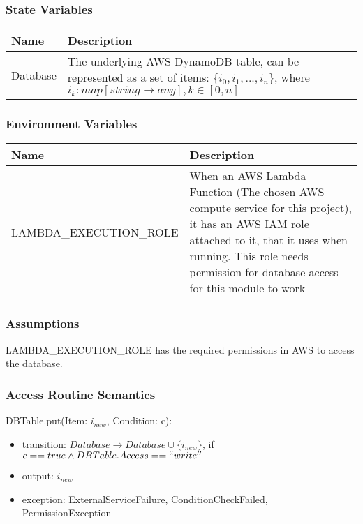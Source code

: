 \documentclass[12pt, titlepage]{article}
\begin{document}
\subsubsection{State Variables}

\begin{center}
  \begin{tabular}{p{4cm} p{12cm}}
    \hline
    \textbf{Name} & \textbf{Description} \\
    \hline
    Database & The underlying AWS DynamoDB table, can be represented
    as a set of items: $\{i_0, i_1, ..., i_n\}$, where $i_k:
    map[string \rightarrow  any], k\in[0,n]$ \\
    \hline
  \end{tabular}
\end{center}

\subsubsection{Environment Variables}

\begin{center}
  \begin{tabular}{p{6cm} p{10cm}}
    \hline
    \textbf{Name} & \textbf{Description} \\
    \hline
    LAMBDA\_EXECUTION\_ROLE & When an AWS Lambda Function (The chosen
    AWS compute service for this project), it has an AWS IAM role
    attached to it, that it uses when running. This role needs
    permission for database access for this module to work \\
    \hline
  \end{tabular}
\end{center}

\subsubsection{Assumptions}

LAMBDA\_EXECUTION\_ROLE has the required permissions in AWS to access
the database.

\subsubsection{Access Routine Semantics}

\noindent DBTable.put(Item: $i_{new}$, Condition: c):
\begin{itemize}
  \item transition: $Database \rightarrow Database \cup \{i_{new}\}$, if $c ==
    true \land DBTable.Access == ``write''$
  \item output: $i_{new}$
  \item exception: ExternalServiceFailure, ConditionCheckFailed,
    PermissionException
\end{itemize}
\end{document}
